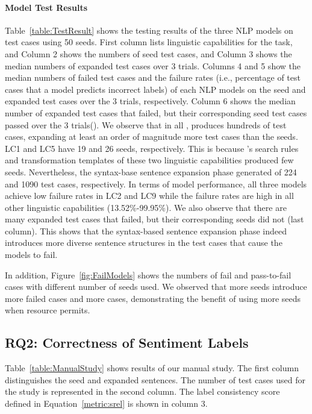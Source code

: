 \paragraph*{Model Test Results} Table~\ref{table:TestResult} shows the testing results of the three NLP models on \tool test cases using 50 seeds. First column lists linguistic capabilities for the \sa task, and Column 2 shows the numbers of seed test cases, and Column 3 shows the median numbers of expanded test cases over 3 trials. Columns 4 and 5 show the median numbers of failed test cases and the failure rates (i.e., percentage of test cases that a model predicts incorrect labels) of each NLP models on the seed and expanded test cases over the 3 trials, respectively. Column 6 shows the median number of expanded test cases that failed, but their corresponding seed test cases passed over the 3 trials(\Ptf). We observe that in all \lcs, \tool produces hundreds of test cases, expanding at least an order of magnitude more test cases than the seeds. LC1 and LC5 have 19 and 26 seeds, respectively. This is because \tool's search rules and transformation templates of these two linguistic capabilities produced few seeds. Nevertheless, the syntax-base sentence expansion phase generated of 224 and 1090 test cases, respectively.
In terms of model performance, all three models achieve low failure rates in LC2 and LC9 while the failure rates are high in all other linguistic capabilities (13.52\%-99.95\%). We also observe that there are many expanded test cases that failed, but their corresponding seeds did not (last column). This shows that the syntax-based sentence expansion phase indeed introduces more diverse sentence structures in the test cases that cause the models to fail.

In addition, Figure~\ref{fig:FailModels} shows the numbers of fail and pass-to-fail cases with different number of seeds used. We observed that more \tool seeds introduce more failed cases and more \Ptf cases, demonstrating the benefit of using more seeds when resource permits.





\subsection{RQ2: Correctness of Sentiment Labels}
Table~\ref{table:ManualStudy} shows results of our manual study. The first column distinguishes the seed and expanded sentences. The number of test cases used for the study is represented in the
second column. The label consistency score defined
in Equation~\ref{metric:srel} is shown in column 3.

